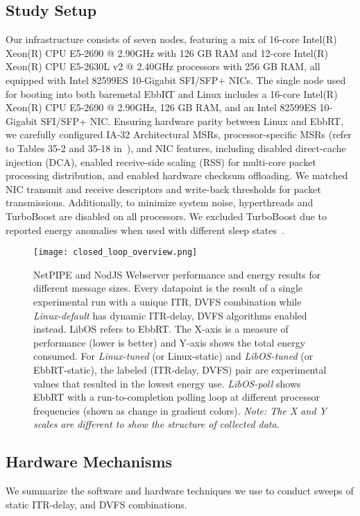 \subsection{Study Setup}
Our infrastructure consists of seven nodes, featuring a mix of 16-core Intel(R) Xeon(R) CPU E5-2690 @ 2.90GHz with 126 GB RAM and 12-core Intel(R) Xeon(R) CPU E5-2630L v2 @ 2.40GHz processors with 256 GB RAM, all equipped with Intel 82599ES 10-Gigabit SFI/SFP+ NICs. The single node used for booting into both baremetal EbbRT and Linux includes a 16-core Intel(R) Xeon(R) CPU E5-2690 @ 2.90GHz, 126 GB RAM, and an Intel 82599ES 10-Gigabit SFI/SFP+ NIC. Ensuring hardware parity between Linux and EbbRT, we carefully configured IA-32 Architectural MSRs, processor-specific MSRs (refer to Tables 35-2 and 35-18 in~\cite{intel_msr}), and NIC features, including disabled direct-cache injection (DCA), enabled receive-side scaling (RSS) for multi-core packet processing distribution, and enabled hardware checksum offloading. We matched NIC transmit and receive descriptors and write-back thresholds for packet transmissions. Additionally, to minimize system noise, hyperthreads and TurboBoost are disabled on all processors. We excluded TurboBoost due to reported energy anomalies when used with different sleep states~\cite{slowdownorsleep}. 
\begin{figure*}[hbt!]
\centering
\texttt{[image: closed\_loop\_overview.png]}
\caption[]{\small NetPIPE and NodJS Webserver performance and energy results for different message sizes. Every datapoint is the result of a single experimental run with a unique ITR, DVFS combination while \textit{Linux-default} has dynamic ITR-delay, DVFS algorithms enabled instead. LibOS refers to EbbRT. The X-axis is a measure of performance (lower is better) and Y-axis shows the total energy consumed. For \textit{Linux-tuned} (or Linux-static) and \textit{LibOS-tuned} (or EbbRT-static), the labeled (ITR-delay, DVFS) pair are experimental values that resulted in the lowest energy use. \textit{LibOS-poll} shows EbbRT with a run-to-completion polling loop at different processor frequencies (shown as change in gradient colors). \textit{Note: The X and Y scales are different to show the structure of collected data.}}
\label{fig:closed_overview}
\vspace{-0.1in}
\end{figure*}

\subsection{Hardware Mechanisms}
\label{sec:hwmech}
We summarize the software and hardware techniques we use to conduct sweeps of static ITR-delay, and DVFS combinations.

